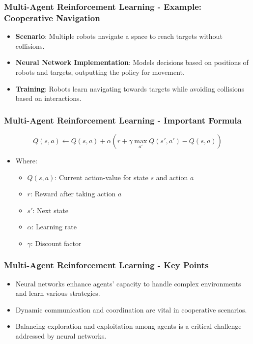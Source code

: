 \documentclass[aspectratio=169]{beamer}
\begin{document}
\begin{frame}[fragile]
    \frametitle{Multi-Agent Reinforcement Learning - Example: Cooperative Navigation}
    \begin{itemize}
        \item \textbf{Scenario}: Multiple robots navigate a space to reach targets without collisions.
        \item \textbf{Neural Network Implementation}: Models decisions based on positions of robots and targets, outputting the policy for movement.
        \item \textbf{Training}: Robots learn navigating towards targets while avoiding collisions based on interactions.
    \end{itemize}
\end{frame}

\begin{frame}[fragile]
    \frametitle{Multi-Agent Reinforcement Learning - Important Formula}
    \begin{equation}
    Q(s, a) \leftarrow Q(s, a) + \alpha \left( r + \gamma \max_{a'} Q(s', a') - Q(s, a) \right)
    \end{equation}
    \begin{itemize}
        \item Where:
        \begin{itemize}
            \item \( Q(s, a) \): Current action-value for state \( s \) and action \( a \)
            \item \( r \): Reward after taking action \( a \)
            \item \( s' \): Next state
            \item \( \alpha \): Learning rate
            \item \( \gamma \): Discount factor
        \end{itemize}
    \end{itemize}
\end{frame}

\begin{frame}[fragile]
    \frametitle{Multi-Agent Reinforcement Learning - Key Points}
    \begin{itemize}
        \item Neural networks enhance agents' capacity to handle complex environments and learn various strategies.
        \item Dynamic communication and coordination are vital in cooperative scenarios.
        \item Balancing exploration and exploitation among agents is a critical challenge addressed by neural networks.
    \end{itemize}
\end{frame}
\end{document}
